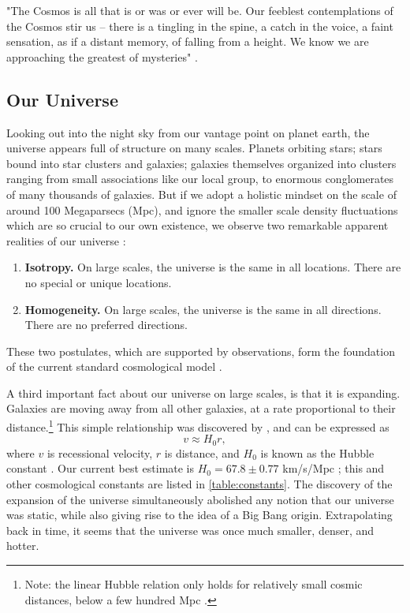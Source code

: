 "The Cosmos is all that is or was or ever will be. Our feeblest contemplations of the Cosmos stir us -- there is a tingling in the spine, a catch in the voice, a faint sensation, as if a distant memory, of falling from a height. We know we are approaching the greatest of mysteries" \citep{Sagan80}.


\subsection{Our Universe}

Looking out into the night sky from our vantage point on planet earth, the universe appears full of structure on many scales. Planets orbiting stars; stars bound into star clusters and galaxies; galaxies themselves organized into clusters ranging from small associations like our local group, to enormous conglomerates of many thousands of galaxies. But if we adopt a holistic mindset on the scale of around 100 Megaparsecs (Mpc), and ignore the smaller scale density fluctuations which are so crucial to our own existence, we observe two remarkable apparent realities of our universe \citep{RydenText}:
\begin{enumerate}
\item {\bf Isotropy.} On large scales, the universe is the same in all locations. There are no special or unique locations.
\item {\bf Homogeneity.} On large scales, the universe is the same in all directions. There are no preferred directions.
\end{enumerate}
These two postulates, which are supported by observations, form the foundation of the current standard cosmological model \citep{BS01}.

A third important fact about our universe on large scales, is that it is expanding. Galaxies are moving away from all other galaxies, at a rate proportional to their distance.\footnote{Note: the linear Hubble relation only holds for relatively small cosmic distances, below a few hundred Mpc \citep{RydenText}.} This simple relationship was discovered by \citet{Hubble29}, and can be expressed as
\begin{equation}
v \approx H_0 r,
\end{equation}
where $v$ is recessional velocity, $r$ is distance, and $H_0$ is known as the Hubble constant \citep{RydenText}. Our current best estimate is $H_0 = 67.8\pm0.77$ km/s/Mpc \citep{PlanckXVI}; this and other cosmological constants are listed in \autoref{table:constants}. The discovery of the expansion of the universe simultaneously abolished any notion that our universe was static, while also giving rise to the idea of a Big Bang origin. Extrapolating back in time, it seems that the universe was once much smaller, denser, and hotter. 

